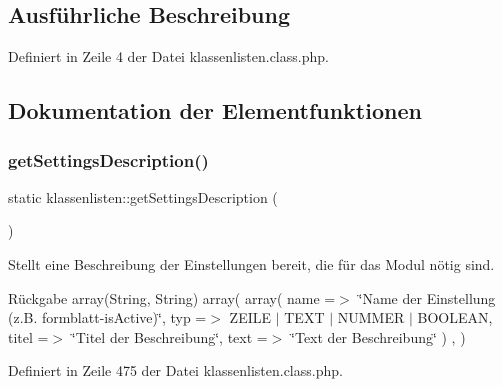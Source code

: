 \subsection{Ausführliche Beschreibung}


Definiert in Zeile 4 der Datei klassenlisten.\+class.\+php.



\subsection{Dokumentation der Elementfunktionen}
\mbox{\label{classklassenlisten_a37fa2fa96f99eb524cc36894bfe2484c}} 
\subsubsection{\texorpdfstring{get\+Settings\+Description()}{getSettingsDescription()}}
{\footnotesize\ttfamily static klassenlisten\+::get\+Settings\+Description (\begin{DoxyParamCaption}{ }\end{DoxyParamCaption})\hspace{0.3cm}{\ttfamily [static]}}

Stellt eine Beschreibung der Einstellungen bereit, die für das Modul nötig sind. \begin{DoxyReturn}{Rückgabe}
array(\+String, String) array( array( \textquotesingle{}name\textquotesingle{} =$>$ \char`\"{}\+Name der Einstellung (z.\+B. formblatt-\/is\+Active)\char`\"{}, \textquotesingle{}typ\textquotesingle{} =$>$ Z\+E\+I\+LE $\vert$ T\+E\+XT $\vert$ N\+U\+M\+M\+ER $\vert$ B\+O\+O\+L\+E\+AN, \textquotesingle{}titel\textquotesingle{} =$>$ \char`\"{}\+Titel der Beschreibung\char`\"{}, \textquotesingle{}text\textquotesingle{} =$>$ \char`\"{}\+Text der Beschreibung\char`\"{} ) , ) 
\end{DoxyReturn}


Definiert in Zeile 475 der Datei klassenlisten.\+class.\+php.

\mbox{\label{classklassenlisten_a837f93ce360f26c279734d32b93b9407}} 
